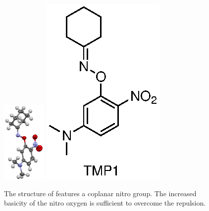 \begin{refsection}
\begin{figure}
\centering
\includegraphics[height=4cm]{Figures/cyclohexanone-oxime-2n-5nme2p.png}
\includegraphics[scale=0.8]{Figures/cyclohexanone-oxime-2n-5nme2p.eps}
\caption[]{The structure of  features a coplanar nitro group. The increased basicity of the nitro oxygen is sufficient to overcome the repulsion.}
\label{fig:cyclohexanone-oxime-2n-5nme2p}
\end{figure}


\end{refsection}
